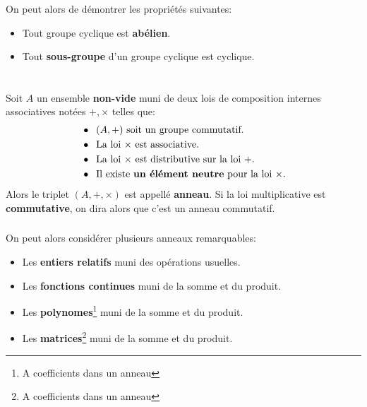 \subsection*{}
On peut alors de démontrer les propriétés suivantes:

\begin{center}
   \begin{itemize}
      \item Tout groupe cyclique est \textbf{abélien}.
      \item Tout \textbf{sous-groupe} d'un groupe cyclique est cyclique.
   \end{itemize}
\end{center}

\chapter*{}
Soit \(A\) un ensemble \textbf{non-vide} muni de deux lois de composition internes associatives notées \(+, \times\) telles que:
\begin{align*}
   &\bullet \;\; (A, +) \text{ soit un groupe commutatif.} \\
   &\bullet \;\; \text{La loi \(\times\) est associative.}\\
   &\bullet \;\; \text{La loi \(\times\) est distributive sur la loi \(+\).}\\
   &\bullet \;\; \text{Il existe \textbf{un élément neutre} pour la loi \(\times\).}
\end{align*}
Alors le triplet \((A, +, \times)\) est appellé \textbf{anneau}. Si la loi multiplicative est \textbf{commutative}, on dira alors que c'est un anneau commutatif.
\subsection*{}
On peut alors considérer plusieurs anneaux remarquables:
\begin{itemize}
   \item Les \textbf{entiers relatifs} muni des opérations usuelles.
   \item Les \textbf{fonctions continues} muni de la somme et du produit.
   \item Les \textbf{polynomes}\footnote[1]{A coefficients dans un anneau} muni de la somme et du produit.
   \item Les \textbf{matrices}\footnote[1]{A coefficients dans un anneau} muni de la somme et du produit.
\end{itemize}

